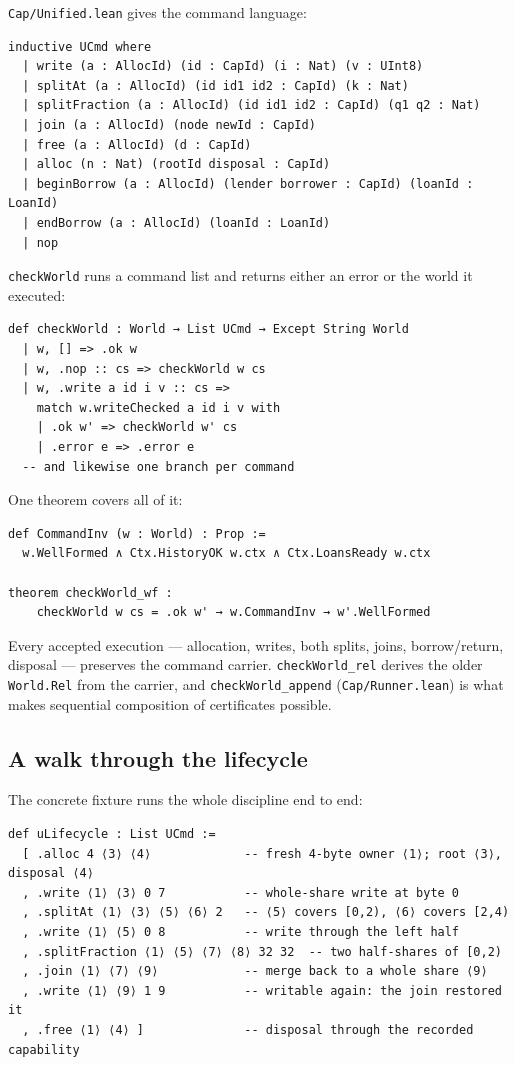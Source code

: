 \documentclass[10pt,a4paper]{article}
\newcommand{\file}[1]{\texttt{#1}}
\newcommand{\lean}[1]{\texttt{#1}}
\begin{document}
\file{Cap/Unified.lean} gives the command language:

\begin{lstlisting}
inductive UCmd where
  | write (a : AllocId) (id : CapId) (i : Nat) (v : UInt8)
  | splitAt (a : AllocId) (id id1 id2 : CapId) (k : Nat)
  | splitFraction (a : AllocId) (id id1 id2 : CapId) (q1 q2 : Nat)
  | join (a : AllocId) (node newId : CapId)
  | free (a : AllocId) (d : CapId)
  | alloc (n : Nat) (rootId disposal : CapId)
  | beginBorrow (a : AllocId) (lender borrower : CapId) (loanId : LoanId)
  | endBorrow (a : AllocId) (loanId : LoanId)
  | nop
\end{lstlisting}

\lean{checkWorld} runs a command list and returns either an error or the world
it executed:

\begin{lstlisting}
def checkWorld : World → List UCmd → Except String World
  | w, [] => .ok w
  | w, .nop :: cs => checkWorld w cs
  | w, .write a id i v :: cs =>
    match w.writeChecked a id i v with
    | .ok w' => checkWorld w' cs
    | .error e => .error e
  -- and likewise one branch per command
\end{lstlisting}

One theorem covers all of it:

\begin{lstlisting}
def CommandInv (w : World) : Prop :=
  w.WellFormed ∧ Ctx.HistoryOK w.ctx ∧ Ctx.LoansReady w.ctx

theorem checkWorld_wf :
    checkWorld w cs = .ok w' → w.CommandInv → w'.WellFormed
\end{lstlisting}

Every accepted execution --- allocation, writes, both splits, joins,
borrow/return, disposal --- preserves the command carrier. \lean{checkWorld\_rel}
derives the older \lean{World.Rel} from the carrier, and \lean{checkWorld\_append}
(\file{Cap/Runner.lean}) is what makes sequential composition of certificates
possible.

\subsection{A walk through the lifecycle}

The concrete fixture runs the whole discipline end to end:

\begin{lstlisting}
def uLifecycle : List UCmd :=
  [ .alloc 4 ⟨3⟩ ⟨4⟩             -- fresh 4-byte owner ⟨1⟩; root ⟨3⟩, disposal ⟨4⟩
  , .write ⟨1⟩ ⟨3⟩ 0 7           -- whole-share write at byte 0
  , .splitAt ⟨1⟩ ⟨3⟩ ⟨5⟩ ⟨6⟩ 2   -- ⟨5⟩ covers [0,2), ⟨6⟩ covers [2,4)
  , .write ⟨1⟩ ⟨5⟩ 0 8           -- write through the left half
  , .splitFraction ⟨1⟩ ⟨5⟩ ⟨7⟩ ⟨8⟩ 32 32  -- two half-shares of [0,2)
  , .join ⟨1⟩ ⟨7⟩ ⟨9⟩            -- merge back to a whole share ⟨9⟩
  , .write ⟨1⟩ ⟨9⟩ 1 9           -- writable again: the join restored it
  , .free ⟨1⟩ ⟨4⟩ ]              -- disposal through the recorded capability
\end{lstlisting}
\end{document}
